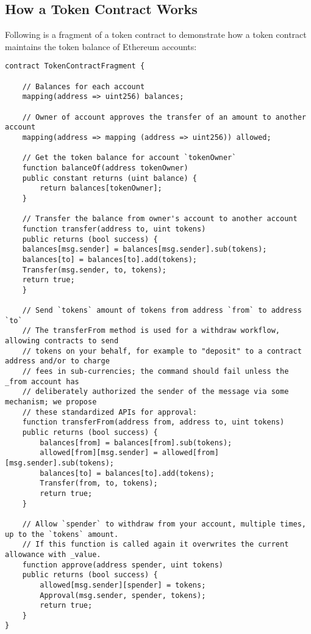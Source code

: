 \subsection{How a Token Contract Works}
Following is a fragment of a token contract to demonstrate how a token contract maintains the token balance of Ethereum accounts:
\begin{lstlisting}[language=Solidity]
contract TokenContractFragment {

    // Balances for each account
    mapping(address => uint256) balances;

    // Owner of account approves the transfer of an amount to another account
    mapping(address => mapping (address => uint256)) allowed;

    // Get the token balance for account `tokenOwner`
    function balanceOf(address tokenOwner) 
    public constant returns (uint balance) {
        return balances[tokenOwner];
    }

    // Transfer the balance from owner's account to another account
    function transfer(address to, uint tokens) 
    public returns (bool success) {
    balances[msg.sender] = balances[msg.sender].sub(tokens);
    balances[to] = balances[to].add(tokens);
    Transfer(msg.sender, to, tokens);
    return true;
    }

    // Send `tokens` amount of tokens from address `from` to address `to`
    // The transferFrom method is used for a withdraw workflow, allowing contracts to send
    // tokens on your behalf, for example to "deposit" to a contract address and/or to charge
    // fees in sub-currencies; the command should fail unless the _from account has
    // deliberately authorized the sender of the message via some mechanism; we propose
    // these standardized APIs for approval:
    function transferFrom(address from, address to, uint tokens) 
    public returns (bool success) {
        balances[from] = balances[from].sub(tokens);
        allowed[from][msg.sender] = allowed[from][msg.sender].sub(tokens);
        balances[to] = balances[to].add(tokens);
        Transfer(from, to, tokens);
        return true;
    }

    // Allow `spender` to withdraw from your account, multiple times, up to the `tokens` amount.
    // If this function is called again it overwrites the current allowance with _value.
    function approve(address spender, uint tokens) 
    public returns (bool success) {
        allowed[msg.sender][spender] = tokens;
        Approval(msg.sender, spender, tokens);
        return true;
    }
}
\end{lstlisting}


